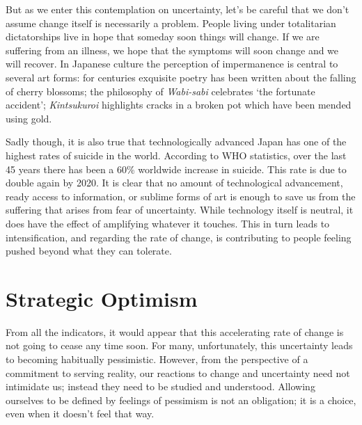 But as we enter this contemplation on uncertainty, let's be careful that
we don't assume change itself is necessarily a problem. People living
under totalitarian dictatorships live in hope that someday soon things
will change. If we are suffering from an illness, we hope that the
symptoms will soon change and we will recover. In Japanese culture the
perception of impermanence is central to several art forms: for
centuries exquisite poetry has been written about the falling of cherry
blossoms; the philosophy of \emph{Wabi-sabi} celebrates `the fortunate
accident'; \emph{Kintsukuroi} highlights cracks in a broken pot which
have been mended using gold.

Sadly though, it is also true that technologically advanced Japan has
one of the highest rates of suicide in the world. According to WHO
statistics,\cite{who-suicide} over the last 45 years there has been a 60\%
worldwide increase in suicide. This rate is due to double again by
2020. It is clear that no amount of technological advancement, ready
access to information, or sublime forms of art is enough to save us from
the suffering that arises from fear of uncertainty. While technology
itself is neutral, it does have the effect of amplifying whatever it
touches. This in turn leads to intensification, and regarding the rate
of change, is contributing to people feeling pushed beyond what they can
tolerate.

\section{Strategic Optimism}

From all the indicators, it would appear that this accelerating rate of
change is not going to cease any time soon. For many, unfortunately,
this uncertainty leads to becoming habitually pessimistic. However, from
the perspective of a commitment to serving reality, our reactions to
change and uncertainty need not intimidate us; instead they need to be
studied and understood. Allowing ourselves to be defined by feelings of
pessimism is not an obligation; it is a choice, even when it doesn't
feel that way.

\clearpage

